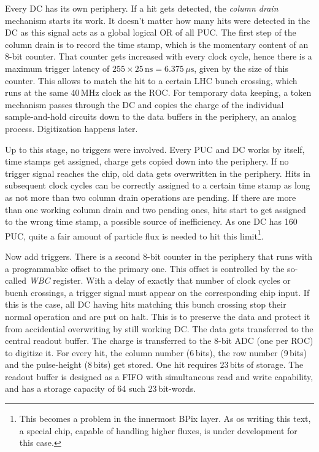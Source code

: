 Every \gls{DC} has its own periphery. If a hit gets detected, the \emph{column drain} mechanism starts its work. It doesn't matter how many hits were detected in the \gls{DC} as this signal acts as a global logical OR of all \gls{PUC}. The first step of the column drain is to record the time stamp, which is the momentary content of an 8-bit counter. That counter gets increased with every clock cycle, hence there is a maximum trigger latency of $255\times25\,\text{ns}=6.375\,\mu\text{s}$, given by the size of this counter. This allows to match the hit to a certain LHC bunch crossing, which runs at the same 40\,MHz clock as the \gls{ROC}. For temporary data keeping, a token mechanism passes through the \gls{DC} and copies the charge of the individual sample-and-hold circuits down to the data buffers in the periphery, an analog process. Digitization happens later.

Up to this stage, no triggers were involved. Every \gls{PUC} and \gls{DC} works by itself, time stamps get assigned, charge gets copied down into the periphery. If no trigger signal reaches the chip, old data gets overwritten in the periphery. Hits in subsequent clock cycles can be correctly assigned to a certain time stamp as long as not more than two column drain operations are pending. If there are more than one working column drain and two pending ones, hits start to get assigned to the wrong time stamp, a possible source of inefficiency. As one \gls{DC} has 160\,\gls{PUC}, quite a fair amount of particle flux is needed to hit this limit\footnote{This becomes a problem in the innermost BPix layer. As os writing this text, a special chip, capable of handling higher fluxes, is under development for this case.}.

Now add triggers. There is a second 8-bit counter in the periphery that runs with a programmabke offset to the primary one. This offset is controlled by the so-called \emph{WBC} register. With a delay of exactly that number of clock cycles or bucnh crossings, a trigger signal must appear on the corresponding chip input. If this is the case, all \gls{DC} having hits matching this bunch crossing stop their normal operation and are put on halt. This is to preserve the data and protect it from accidential overwriting by still working \gls{DC}. The data gets transferred to the central readout buffer. The charge is transferred to the 8-bit ADC (one per \gls{ROC}) to digitize it. For every hit, the column number (6\,bits), the row number (9\,bits) and the pulse-height (8\,bits) get stored. One hit requires 23\,bits of storage. The readout buffer is designed as a FIFO with simultaneous read and write capability, and has a storage capacity of 64 such 23\,bit-words.

